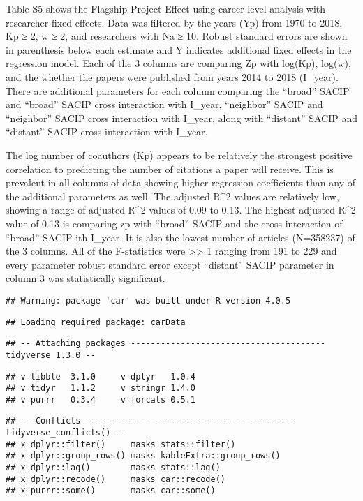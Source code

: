 \documentclass[
]{article}
\begin{document}
Table S5 shows the Flagship Project Effect using career-level analysis
with researcher fixed effects. Data was filtered by the years (Yp) from
1970 to 2018, Kp ≥ 2, w ≥ 2, and researchers with Na ≥ 10. Robust
standard errors are shown in parenthesis below each estimate and Y
indicates additional fixed effects in the regression model. Each of the
3 columns are comparing Zp with log(Kp), log(w), and the whether the
papers were published from years 2014 to 2018 (I\_year). There are
additional parameters for each column comparing the ``broad'' SACIP and
``broad'' SACIP cross interaction with I\_year, ``neighbor'' SACIP and
``neighbor'' SACIP cross interaction with I\_year, along with
``distant'' SACIP and ``distant'' SACIP cross-interaction with I\_year.

The log number of coauthors (Kp) appears to be relatively the strongest
positive correlation to predicting the number of citations a paper will
receive. This is prevalent in all columns of data showing higher
regression coefficients than any of the additional parameters as well.
The adjusted R\^{}2 values are relatively low, showing a range of
adjusted R\^{}2 values of 0.09 to 0.13. The highest adjusted R\^{}2
value of 0.13 is comparing zp with ``broad'' SACIP and the
cross-interaction of ``broad'' SACIP ith I\_year. It is also the lowest
number of articles (N=358237) of the 3 columns. All of the F-statistics
were \textgreater\textgreater{} 1 ranging from 191 to 229 and every
parameter robust standard error except ``distant'' SACIP parameter in
column 3 was statistically significant.

\begin{verbatim}
## Warning: package 'car' was built under R version 4.0.5
\end{verbatim}

\begin{verbatim}
## Loading required package: carData
\end{verbatim}

\begin{verbatim}
## -- Attaching packages --------------------------------------- tidyverse 1.3.0 --
\end{verbatim}

\begin{verbatim}
## v tibble  3.1.0     v dplyr   1.0.4
## v tidyr   1.1.2     v stringr 1.4.0
## v purrr   0.3.4     v forcats 0.5.1
\end{verbatim}

\begin{verbatim}
## -- Conflicts ------------------------------------------ tidyverse_conflicts() --
## x dplyr::filter()     masks stats::filter()
## x dplyr::group_rows() masks kableExtra::group_rows()
## x dplyr::lag()        masks stats::lag()
## x dplyr::recode()     masks car::recode()
## x purrr::some()       masks car::some()
\end{verbatim}
\end{document}
